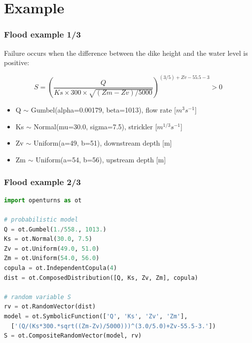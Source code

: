 \documentclass{beamer}
\begin{document}

\section{Example}

\begin{frame}[containsverbatim]
\frametitle{Flood example 1/3}

Failure occurs when the difference between the dike height and the water level is positive:

$$S = \left(\frac{Q}{Ks\times300\times\sqrt{(Zm-Zv)/5000}}\right)^{(3/5) +Zv-55.5-3} > 0$$

\begin{itemize}
\item Q $\sim$ Gumbel(alpha=0.00179, beta=1013), flow rate [$m^3s^{-1}$]
\item Ks $\sim$ Normal(mu=30.0, sigma=7.5), strickler [$m^{1/3}s^{-1}$]
\item Zv $\sim$ Uniform(a=49, b=51), downstream depth [m]
\item Zm $\sim$ Uniform(a=54, b=56), upstream depth [m]


\end{itemize}

\end{frame}

\begin{frame}[containsverbatim]
\frametitle{Flood example 2/3}
\begin{adjustbox}{max width=\linewidth, margin=0pt}
\begin{lstlisting}[language=Python,basicstyle=\ttfamily,keywordstyle=\color{red}]
import openturns as ot

# probabilistic model
Q = ot.Gumbel(1./558., 1013.)
Ks = ot.Normal(30.0, 7.5)
Zv = ot.Uniform(49.0, 51.0)
Zm = ot.Uniform(54.0, 56.0)
copula = ot.IndependentCopula(4)
dist = ot.ComposedDistribution([Q, Ks, Zv, Zm], copula)

# random variable S
rv = ot.RandomVector(dist)
model = ot.SymbolicFunction(['Q', 'Ks', 'Zv', 'Zm'],
  ['(Q/(Ks*300.*sqrt((Zm-Zv)/5000)))^(3.0/5.0)+Zv-55.5-3.'])
S = ot.CompositeRandomVector(model, rv)
\end{lstlisting}
\end{adjustbox}
\end{frame}
\end{document}
